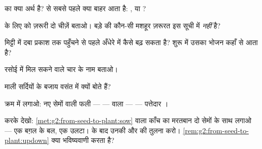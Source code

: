 \begin{exercise}[$\star$]\label{exo:g2:from-seed-to-plant:2}
\emph{} का क्या अर्थ है?  से सबसे पहले क्या बाहर आता
है: , या ?
\end{exercise}

\begin{exercise}[$\star$]\label{exo:g2:from-seed-to-plant:3}
 के लिए  को ज़रूरी दो चीज़ें बताओ। बड़े  की कौन-सी
मशहूर ज़रूरत इस सूची में \emph{नहीं} है?
\end{exercise}

\begin{exercise}[$\star$]\label{exo:g2:from-seed-to-plant:4}
मिट्टी में दबा  प्रकाश तक पहुँचने से पहले अँधेरे में कैसे बढ़
सकता है? शुरू में उसका भोजन कहाँ से आता है?
\end{exercise}

\begin{exercise}[$\star$]\label{exo:g2:from-seed-to-plant:5}
रसोई में मिल सकने वाले चार  के नाम बताओ।
\end{exercise}

\begin{exercise}[$\star$]\label{exo:g2:from-seed-to-plant:6}
माली सर्दियों के बजाय वसंत में क्यों बोते हैं?
\end{exercise}

\begin{exercise}[$\star$]\label{exo:g2:from-seed-to-plant:7}
क्रम में लगाओ: नए सेमों वाली फली ---  ---  वाला  ---
 --- पत्तेदार ।
\end{exercise}

\begin{exercise}[$\star$]\label{exo:g2:from-seed-to-plant:8}
करके देखो: \cref{met:g2:from-seed-to-plant:sow} वाला काँच का मरतबान
दो सेमों के साथ लगाओ --- एक बग़ल के बल, एक उलटा।  के बाद उनकी
 और  की तुलना करो।
\cref{rem:g2:from-seed-to-plant:updown} क्या भविष्यवाणी करता है?
\end{exercise}


